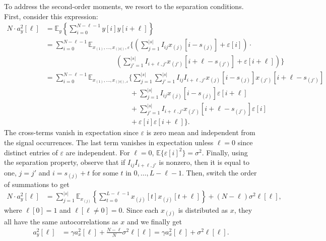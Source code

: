 \documentclass[12pt]{article}
\newcommand{\E}{\mathbb{E}}
\newcommand{\1}{\mathbf{1}}
\theoremstyle{plain}
\theoremstyle{definition}
\theoremstyle{remark}
\theoremstyle{plain}
\theoremstyle{remark}
\theoremstyle{plain}
\theoremstyle{plain}
\theoremstyle{plain}
\numberwithin{equation}{section}
\begin{document}
To address the second-order moments, we resort to the separation conditions. First, consider this expression:
\begin{align*}
N \cdot a_y^2[\ell] & = \E_y\left\{ \sum_{i = 0}^{N-\ell-1} y[i] y[i+\ell] \right\} \\
& = \sum_{i = 0}^{N-\ell-1} \E_{x_{(1)}, \ldots, x_{(|s|)}, \varepsilon}\Bigg\{ \left( \sum_{j = 1}^{|s|} I_{ij} x_{(j)}[i-s_{(j)}] + \varepsilon[i] \right) \cdot \\
& \qquad \qquad \qquad \qquad \qquad  \left( \sum_{j' = 1}^{|s|} I_{i+\ell,j'} x_{(j')}[i+\ell-s_{(j')}] + \varepsilon[i+\ell] \right)  \Bigg\} \\
& = \sum_{i = 0}^{N-\ell-1} \E_{x_{(1)}, \ldots, x_{(|s|), \varepsilon}}\Bigg\{ \sum_{j = 1}^{|s|} \sum_{j' = 1}^{|s|} I_{ij}  I_{i+\ell,j'} x_{(j)}[i-s_{(j)}]  x_{(j')}[i+\ell-s_{(j')}] \\
& \qquad \qquad \qquad \qquad \qquad \qquad + \sum_{j = 1}^{|s|} I_{ij} x_{(j)}[i-s_{(j)}] \varepsilon[i+\ell] \\
& \qquad \qquad \qquad \qquad \qquad \qquad + \sum_{j' = 1}^{|s|} I_{i+\ell,j'} x_{(j')}[i+\ell-s_{(j')}] \varepsilon[i] \\
& \qquad \qquad \qquad \qquad \qquad \qquad + \varepsilon[i] \varepsilon[i + \ell] \Bigg\}.
\end{align*}
The cross-terms vanish in expectation since $\varepsilon$ is zero mean and independent from the signal occurrences. The last term vanishes in expectation unless $\ell = 0$ since distinct entries of $\varepsilon$ are independent. For $\ell = 0$, $\E\{\varepsilon[i]^2\} = \sigma^2$. Finally, using the separation property, observe that if $I_{ij}  I_{i+\ell,j'}$ is nonzero, then it is equal to one, $j = j'$ and $i = s_{(j)} + t$ for some $t$ in $0, \ldots, L-\ell-1$. Then, switch the order of summations to get
\begin{align}
N \cdot a_y^2[\ell] & = \sum_{j=1}^{|s|} \E_{x_{(j)}}\left\{ \sum_{t = 0}^{L-\ell-1} x_{(j)}[t] x_{(j)}[t+\ell] \right\} + (N-\ell)\sigma^2 \ell[\ell],
\end{align}
where $\ell[0] = 1$ and $\ell[\ell \neq 0] = 0$. Since each $x_{(j)}$ is distributed as $x$, they all have the same autocorrelations as $x$ and we finally get
\begin{align}
a_y^2[\ell] & = \gamma a_x^2[\ell] + \frac{N-\ell}{N}\sigma^2 \ell[\ell] = \gamma a_x^2[\ell] + \sigma^2 \ell[\ell].
\end{align}
\end{document}
